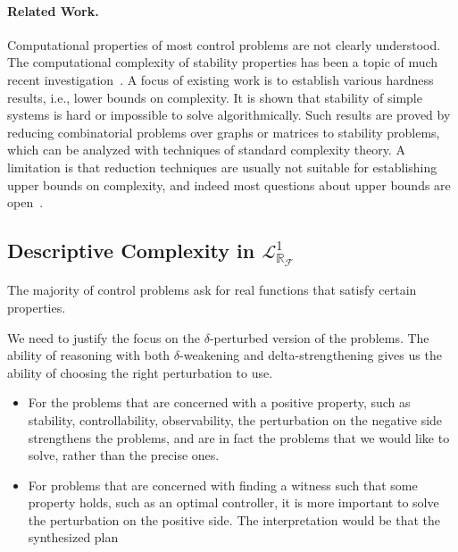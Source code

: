 \documentclass[10pt]{article}
\newcommand{\lrf}{\mathcal{L}_{\mathbb{R}_{\mathcal{F}}}}
\theoremstyle{definition}
\begin{document}
\paragraph{Related Work.} Computational properties of most control problems are not clearly understood. The computational complexity of stability properties has been a topic of much recent investigation~\cite{DBLP:journals/corr/AhmadiP13,DBLP:journals/automatica/BlondelT99,DBLP:journals/automatica/BlondelT00,AAAthesis,DBLP:conf/hybrid/PrabhakarV13,DBLP:journals/corr/abs-1210-7420}. A focus of existing work is to establish various hardness results, i.e., lower bounds on complexity. It is shown that stability of simple systems is hard or impossible to solve algorithmically. Such results are proved by reducing combinatorial problems over graphs or matrices to stability problems, which can be analyzed with techniques of standard complexity theory. A limitation is that reduction techniques are usually not suitable for establishing upper bounds on complexity, and indeed most questions about upper bounds are open~\cite{AAAthesis}. 

\subsection{Descriptive Complexity in $\lrf^1$} 

The majority of control problems ask for real functions that satisfy certain properties. 

We need to justify the focus on the $\delta$-perturbed version of the problems. The ability of reasoning with both $\delta$-weakening and delta-strengthening gives us the ability of choosing the right perturbation to use. 
\begin{itemize}
\item For the problems that are concerned with a positive property, such as stability, controllability, observability, the perturbation on the negative side strengthens the problems, and are in fact the problems that we would like to solve, rather than the precise ones. 
\item For problems that are concerned with finding a witness such that some property holds, such as an optimal controller, it is more important to solve the perturbation on the positive side. The interpretation would be that the synthesized plan 
\end{itemize}
\end{document}
